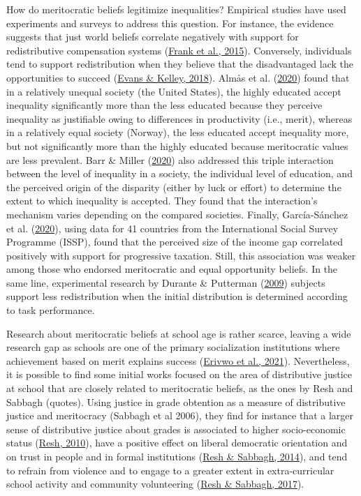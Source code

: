 \documentclass[
  letterpaper,
  DIV=11,
  numbers=noendperiod]{scrartcl}
\begin{document}
How do meritocratic beliefs legitimize inequalities? Empirical studies
have used experiments and surveys to address this question. For
instance, the evidence suggests that just world beliefs correlate
negatively with support for redistributive compensation systems
(\protect\hyperlink{ref-frank_performance_2015}{Frank et al., 2015}).
Conversely, individuals tend to support redistribution when they believe
that the disadvantaged lack the opportunities to succeed
(\protect\hyperlink{ref-evans_strong_2018}{Evans \& Kelley, 2018}).
Almås et al. (\protect\hyperlink{ref-almas_cutthroat_2020}{2020}) found
that in a relatively unequal society (the United States), the highly
educated accept inequality significantly more than the less educated
because they perceive inequality as justifiable owing to differences in
productivity (i.e., merit), whereas in a relatively equal society
(Norway), the less educated accept inequality more, but not
significantly more than the highly educated because meritocratic values
are less prevalent. Barr \& Miller
(\protect\hyperlink{ref-barr_effect_2020}{2020}) also addressed this
triple interaction between the level of inequality in a society, the
individual level of education, and the perceived origin of the disparity
(either by luck or effort) to determine the extent to which inequality
is accepted. They found that the interaction's mechanism varies
depending on the compared societies. Finally, García-Sánchez et al.
(\protect\hyperlink{ref-garcia-sanchez_attitudes_2020}{2020}), using
data for 41 countries from the International Social Survey Programme
(ISSP), found that the perceived size of the income gap correlated
positively with support for progressive taxation. Still, this
association was weaker among those who endorsed meritocratic and equal
opportunity beliefs. In the same line, experimental research by Durante
\& Putterman (\protect\hyperlink{ref-durante_preferences_2009}{2009})
subjects support less redistribution when the initial distribution is
determined according to task performance.

Research about meritocratic beliefs at school age is rather scarce,
leaving a wide research gap as schools are one of the primary
socialization institutions where achievement based on merit explains
success (\protect\hyperlink{ref-erivwo_meritocracy_2021}{Erivwo et al.,
2021}). Nevertheless, it is possible to find some initial works focused
on the area of distributive justice at school that are closely related
to meritocratic beliefs, as the ones by Resh and Sabbagh (quotes). Using
justice in grade obtention as a measure of distributive justice and
meritocracy (Sabbagh et al 2006), they find for instance that a larger
sense of distributive justice about grades is associated to higher
socio-economic status (\protect\hyperlink{ref-resh_sense_2010}{Resh,
2010}), have a positive effect on liberal democratic orientation and on
trust in people and in formal institutions
(\protect\hyperlink{ref-resh_sense_2014}{Resh \& Sabbagh, 2014}), and
tend to refrain from violence and to engage to a greater extent in
extra-curricular school activity and community volunteering
(\protect\hyperlink{ref-resh_sense_2017}{Resh \& Sabbagh, 2017}).
\end{document}
